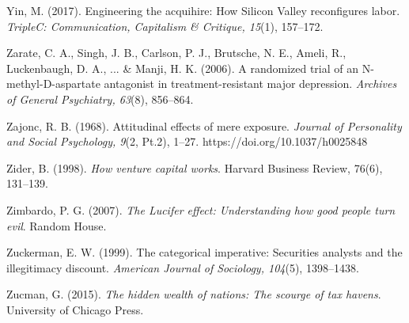 \begin{thebibliography}{}


    Yin, M. (2017). Engineering the acquihire: How Silicon Valley reconfigures labor. \textit{TripleC: Communication, Capitalism \& Critique, 15}(1), 157–172.


    Zarate, C. A., Singh, J. B., Carlson, P. J., Brutsche, N. E., Ameli, R., Luckenbaugh, D. A., ... \& Manji, H. K. (2006). A randomized trial of an N-methyl-D-aspartate antagonist in treatment-resistant major depression. \textit{Archives of General Psychiatry, 63}(8), 856–864.

    Zajonc, R. B. (1968). Attitudinal effects of mere exposure. \textit{Journal of Personality and Social Psychology, 9}(2, Pt.2), 1--27. https://doi.org/10.1037/h0025848

    Zider, B. (1998). \textit{How venture capital works}. Harvard Business Review, 76(6), 131–139.

    Zimbardo, P. G. (2007). \textit{The Lucifer effect: Understanding how good people turn evil}. Random House.

    Zuckerman, E. W. (1999). The categorical imperative: Securities analysts and the illegitimacy discount. \textit{American Journal of Sociology, 104}(5), 1398–1438.

    Zucman, G. (2015). \textit{The hidden wealth of nations: The scourge of tax havens}. University of Chicago Press.

    
    
    
    
   
    
    
     
    
    
    
    
    
    
    
    
    
     
    
     
    

    
    
    
    
        
    
    
    
    

    
    
    
    
    
        

    
    
    
    
     
    
    
    
    
    
        
    
    
    
    
    
    
    
    
    
     
    
    
     


\end{thebibliography}